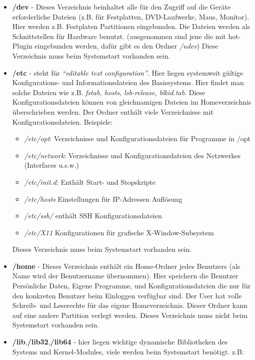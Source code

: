 \begin{itemize}
\begin{itemize}
			\item \textbf{/dev} - Dieses Verzeichnis beinhaltet alle für den Zugriff
			auf die Geräte erforderliche Dateien (z.B. für  Festplatten, DVD-Laufwerke, Maus, Monitor).
			Hier werden z.B. Festplaten Partitionen eingebunden. Die Dateien werden als Schnittstellen
			für Hardware benutzt.
			(ausgenommen sind jene die mit hot-Plugin eingebunden werden, dafür gibt es den Ordner \textit{/udev})
			Diese Verzeichnis muss beim Systemstart vorhanden sein.
			\item \textbf{/etc} - steht für \textit{``editable text configuration''}.
			Hier liegen systemweit gültige Konfigurations- und Informationsdateien des Basissystems.
			Hier findet man solche Dateien wie z.B. \textit{fstab, hosts, lsb-release, blkid.tab}.
			Diese Konfigurationsdateien können von gleichnamigen Dateien im Homeverzeichnis überschrieben werden.
			Der Ordner enthält viele Verzeichnisse mit Konfigurationsdateien.
			Beispiele:
			\begin{itemize}
				\item \textit{/etc/opt}: Verzeichnisse und Konfigurationsdateien für Programme in /opt
				\item \textit{/etc/network}: Verzeichnisse und Konfigurationsdateien des Netzwerkes (Interfaces u.s.w.)
				\item \textit{/etc/init.d}: Enthält Start- und Stopskripte
				\item \textit{/etc/hosts} Einstellungen für IP-Adressen Auflösung
				\item \textit{/etc/ssh/} enthält SSH Konfigurationsdateien
				\item \textit{/etc/X11} Konfigurationen für grafische X-Window-Subsystem
			\end{itemize}
			Dieses Verzeichnis muss beim Systemstart vorhanden sein.
			\item \textbf{/home} - Dieses Verzeichnis enthält ein Home-Ordner jedes Benutzers
			(als Name wird der Benutzername übernommen). Hier speichern die Benutzer Persönliche Daten, Eigene Programme,
			und Konfigurationsdateien die nur für den konkreten Benutzer beim Einloggen verfügbar sind.
			Der User hat volle Schreib- und Leserechte für das eigene Homeverzeichnis.
			Dieser Ordner kann auf eine andere Partition verlegt werden.
			Dieses Verzeichnis muss nicht beim Systemstart vorhanden sein.
			\item \textbf{/lib},\textbf{/lib32},\textbf{/lib64}  - hier liegen wichtige dynamische Bibliotheken des Systems und Kernel-Modules,
			viele werden beim Systemstart benötigt. z.B:

\end{itemize}
\end{itemize}
